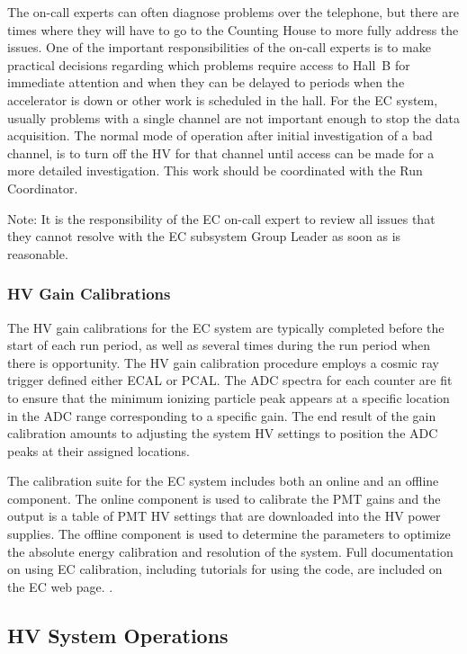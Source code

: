 \documentclass[letterpaper,10pt]{article}
\begin{document}
The on-call experts can often diagnose problems over the telephone, but there are times where they
will have to go to the Counting House to more fully address the issues. One of the important
responsibilities of the on-call experts is to make practical decisions regarding which problems 
require access to Hall~B for immediate attention and when they can be delayed to periods when the 
accelerator is down or other work is scheduled in the hall. For the EC system, usually problems 
with a single channel are not important enough to stop the data acquisition. The normal mode of 
operation after initial investigation of a bad channel, is to turn off the HV for that channel 
until access can be made for a more detailed investigation. This work should be coordinated with
the Run Coordinator.

Note: It is the responsibility of the EC on-call expert to review all issues that they cannot
resolve with the EC subsystem Group Leader as soon as is reasonable.

\subsubsection{HV Gain Calibrations}
\label{gain-calib}

The HV gain calibrations for the EC system are typically completed before the start of each run
period, as well as several times during the run period when there is opportunity. The HV gain 
calibration procedure employs a cosmic ray trigger defined either ECAL or PCAL. 
The ADC spectra for each counter are fit to ensure that the minimum ionizing particle peak appears 
at a specific location in the ADC range corresponding to a specific gain. The end result of the 
gain calibration amounts to adjusting the system HV settings to position the ADC peaks at their 
assigned locations.

The calibration suite for the EC system includes both an online and an offline component. The
online component is used to calibrate the PMT gains and the output is a table of PMT HV settings
that are downloaded into the HV power supplies. The offline component is used to determine the
parameters to optimize the absolute energy calibration and resolution of the system. Full documentation
on using EC calibration, including tutorials for using the code, are included on the EC web page.
\cite{ecal-web}.


\subsection{HV System Operations}
\end{document}
